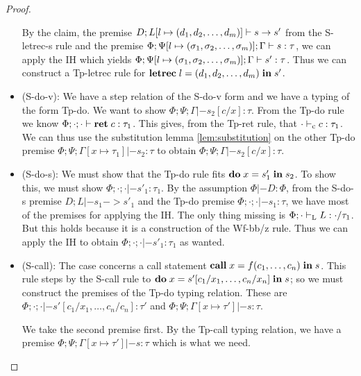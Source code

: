 \documentclass[a4paper, oneside, 10pt, draft]{memoir}
\begin{document}
\begin{proof}
\begin{itemize}
    By the claim, the premise $D;L[l\mapsto (d_1, d_2, \dotsc, d_m)] |- s -> s'$
    from the S-letrec-s rule and the premise $\Phi;\Psi[l \mapsto
    (\sigma_1, \sigma_2, \dotsc, \sigma_m)];\Gamma |- s : \tau$, we can apply the IH which yields $\Phi;\Psi[l \mapsto
    (\sigma_1, \sigma_2, \dotsc, \sigma_m)];\Gamma |- s' : \tau$. Thus we can construct a Tp-letrec
    rule for $\mathbf{letrec} \; l = (d_1, d_2, \dotsc, d_m) \; \mathbf{in} \; s'$.
  \item (S-do-v):
    We have a step relation of the S-do-v form and we have a typing of
    the form Tp-do. We want to show $\Phi;\Psi;\Gamma |- s_2[c/x] :
    \tau$. From the Tp-do rule we know $\Phi;\cdot;\cdot |- \mathbf{ret} \; c :
    \tau_1$. This gives, from the Tp-ret rule, that $\cdot |-_{\mathrm{c}} c :
    \tau_1$. We can thus use the substitution lemma
    \ref{lem:substitution} on the other Tp-do premise
    $\Phi;\Psi;\Gamma[x \mapsto \tau_1] |- s_2 : \tau$ to obtain
    $\Phi;\Psi;\Gamma |- s_2[c/x] : \tau$.
  \item (S-do-s): We must show that the Tp-do rule fits
    $\mathbf{do} \; x = s'_1 \; \mathbf{in} \; s_2$. To show this, we must show $\Phi;\cdot;\cdot
    |- s'_1 : \tau_1$. By the assumption $\Phi |- D : \Phi$, from the
    S-do-s premise $D;L |- s_1 -> s'_1$ and the Tp-do premise
    $\Phi;\cdot;\cdot |- s_1 : \tau$, we have most of the premises for
    applying the IH. The only thing missing is $\Phi;\cdot |-_{\mathrm{L}} L :
    \cdot / \tau_1$. But this holds because it is a construction of the
    Wf-bb/z rule. Thus we can apply the IH to obtain $\Phi;\cdot;\cdot
    |- s'_1 : \tau_1$ as wanted.
  \item (S-call):
    The case concerns a call statement
    $\mathbf{call} \; x = f (c_1,\dotsc,c_n)\; \mathbf{in} \; s$. This rule steps by the S-call
    rule to $\mathbf{do} \; x = s'[c_1/x_1,\dotsc,c_n/x_n] \; \mathbf{in} \; s$; so we
    must construct the premises of the Tp-do typing relation. These are
    $\Phi;\cdot;\cdot |- s'[c_1/x_1,\dotsc,c_n/c_n] : \tau'$ and
    $\Phi;\Psi;\Gamma[x \mapsto  \tau'] |- s : \tau$.

    We take the second premise first. By the Tp-call typing relation, we
    have a premise $\Phi;\Psi;\Gamma[x \mapsto \tau'] |- s : \tau$
    which is what we need.


\end{itemize}
\end{proof}
\end{document}
